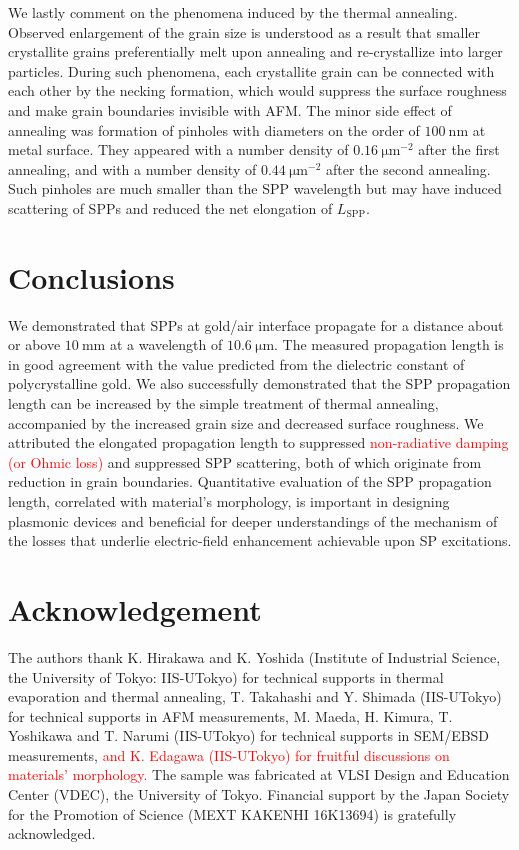 \documentclass[aip,apl,reprint]{revtex4-1}
\begin{document}
We lastly comment on the phenomena induced by the thermal annealing.
Observed enlargement of the grain size is understood as a result that smaller crystallite grains preferentially melt upon annealing\cite{Buffat} and re-crystallize into larger particles. 
During such phenomena, each crystallite grain can be connected with each other by the necking formation, which would suppress the surface roughness and make grain boundaries invisible with AFM. The minor side effect of annealing was formation of pinholes with diameters on the order of $100\:\mathrm{nm}$ at metal surface. They appeared with a number density of $0.16\:\mathrm{\mu m}^{-2}$ after the first annealing, and with a number density of $0.44\:\mathrm{\mu m}^{-2}$ after the second annealing. Such pinholes are much smaller than the SPP wavelength but may have induced scattering of SPPs and reduced the net elongation of $L_{\mathrm{SPP}}$.
	
\section{Conclusions}
\label{sec:conclusion}
We demonstrated that SPPs at gold/air interface propagate for a distance about or above $10\:\mathrm{mm}$ at a wavelength of $10.6\:\mathrm{\mu m}$. The measured propagation length is in good agreement with the value predicted from the dielectric constant of polycrystalline gold. We also successfully demonstrated that the SPP propagation length can be increased by the simple treatment of thermal annealing, accompanied by the increased grain size and decreased surface roughness. 
We attributed the elongated propagation length to suppressed \textcolor{red}{non-radiative damping (or Ohmic loss)} and suppressed SPP scattering, both of which originate from reduction in grain boundaries. 
Quantitative evaluation of the SPP propagation length, correlated with material's morphology, is important in designing plasmonic devices and beneficial for deeper understandings of the mechanism of the losses that underlie electric-field enhancement achievable upon SP excitations.


\section*{Acknowledgement}
The authors thank K. Hirakawa and K. Yoshida (Institute of Industrial Science, the University of Tokyo: IIS-UTokyo) for technical supports in thermal evaporation and thermal annealing, T. Takahashi and Y. Shimada (IIS-UTokyo) for technical supports in AFM measurements, M. Maeda, H. Kimura, T. Yoshikawa and T. Narumi (IIS-UTokyo) for technical supports in SEM/EBSD measurements, \textcolor{red}{and K. Edagawa (IIS-UTokyo) for fruitful discussions on materials' morphology.}
The sample was fabricated at VLSI Design and Education Center (VDEC), the University of Tokyo. Financial support by the Japan Society for the Promotion of Science (MEXT KAKENHI 16K13694) is gratefully acknowledged.


\end{document}
